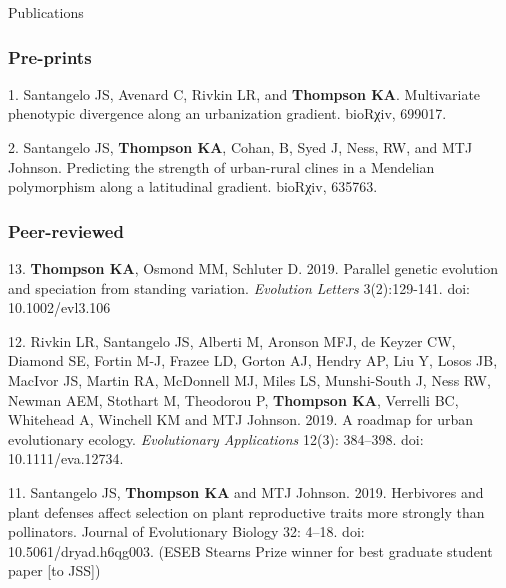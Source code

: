 \documentclass[12pt]{article}
\begin{document}

\noindent\begin{rSection}{Publications}

\subsubsection*{Pre-prints}

\noindent\hspace{.1cm}1. Santangelo JS, Avenard C, Rivkin LR, and \textbf{Thompson KA}. Multivariate phenotypic divergence along an urbanization gradient. bioRχiv, 699017.

\noindent\hspace{.1cm}2. Santangelo JS, \textbf{Thompson KA}, Cohan, B, Syed J, Ness, RW, and MTJ Johnson. Predicting the strength of urban-rural clines in a Mendelian polymorphism along a latitudinal gradient. bioRχiv, 635763.

\subsubsection*{Peer-reviewed}

\noindent\hspace{.1cm}13. \textbf{Thompson KA}, Osmond MM, Schluter D. 2019. Parallel genetic evolution and speciation from standing variation. \textit{Evolution Letters} 3(2):129-141. doi: 10.1002/evl3.106

\noindent\hspace{.1cm}12. Rivkin LR, Santangelo JS, Alberti M, Aronson MFJ, de Keyzer CW, Diamond SE, Fortin M-J, Frazee LD, Gorton AJ, Hendry AP, Liu Y, Losos JB, MacIvor JS, Martin RA, McDonnell MJ, Miles LS, Munshi-South J, Ness RW, Newman AEM, Stothart M, Theodorou P, \textbf{Thompson KA}, Verrelli BC, Whitehead A, Winchell KM and MTJ Johnson. 2019. A roadmap for urban evolutionary ecology. \textit{Evolutionary Applications} 12(3): 384–398. doi: 10.1111/eva.12734.

\noindent\hspace{.1cm}11. Santangelo JS, \textbf{Thompson KA} and MTJ Johnson. 2019. Herbivores and plant defenses affect selection on plant reproductive traits more strongly than pollinators. Journal of Evolutionary Biology 32: 4–18. doi: 10.5061/dryad.h6qg003.
(ESEB Stearns Prize winner for best graduate student paper [to JSS])


\end{rSection}
\end{document}
